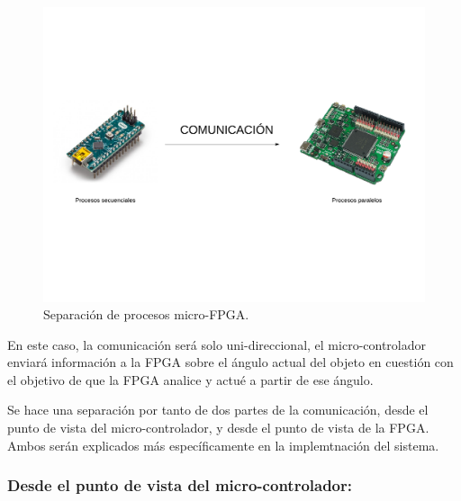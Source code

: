\begin{figure}[H]
	\center
	\includegraphics[trim = 0mm 40mm 0mm 20mm, clip,scale=0.4]{imagenes/Balancing_robot/coexistencia1.pdf}
	\caption{Separación de procesos micro-FPGA.}
	\label{fig:coexistencia1}
\end{figure}

En este caso, la comunicación será solo uni-direccional, el micro-controlador enviará información a la FPGA sobre el ángulo actual del objeto en cuestión con el objetivo de que la FPGA analice y actué a partir de ese ángulo.\newline

Se hace una separación por tanto de dos partes de la comunicación, desde el punto de vista del micro-controlador, y desde el punto de vista de la FPGA. Ambos serán explicados más específicamente en la implemtnación del sistema. 

\subsubsection{Desde el punto de vista del micro-controlador:}

